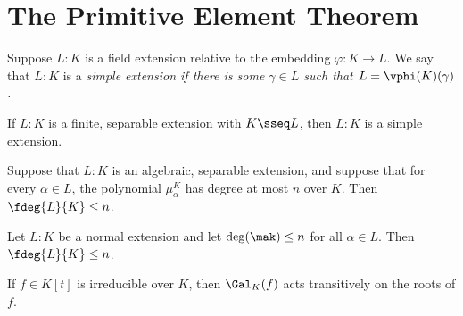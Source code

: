 \documentclass[a4paper]{article}
\begin{document}
\section{The Primitive Element Theorem}
\begin{tdefinition}
  Suppose \( L:K \) is a field extension relative to the embedding \( \varphi:K\to L \).
  We say that \( L:K \) is a \it{simple extension} if there is some \( \gamma\in L \) such that \( L=\vphi(K)(\gamma) \).
\end{tdefinition}

\begin{ttheorem}
  If \( L:K \) is a finite, separable extension with \( K\sseq L \), then \( L:K \) is a simple extension.
\end{ttheorem}

\begin{tcorollary}
  Suppose that \( L:K \) is an algebraic, separable extension, and suppose that for every \( \alpha\in L \), the polynomial \( \mu_\alpha^K \) has degree at most \( n \) over \( K \).
  Then \( \fdeg{L}{K}\leq n \).
\end{tcorollary}

\quad Let \( L:K \) be a normal extension and let \( \deg(\mak)\leq n \) for all \( \alpha\in L \).
Then \( \fdeg{L}{K}\leq n \).

\begin{tcorollary}
  If \( f\in K[t] \) is irreducible over \( K \), then \( \Gal_K(f) \) acts transitively on the roots of \( f \).
\end{tcorollary}
\end{document}
